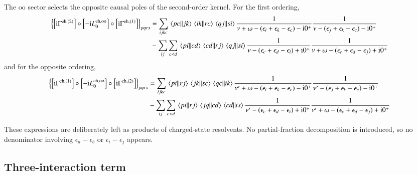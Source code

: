 \documentclass[aip,jcp,reprint,noshowkeys,superscriptaddress]{revtex4-1}
\newcommand{\eps}{\epsilon}
\newcommand{\ii}{\mathrm{i}}
\newcommand{\eh}{\text{eh}}
\begin{document}
\begin{widetext}
The $\text{oo}$ sector selects the opposite causal poles of the second-order kernel.
For the first ordering,
\begin{equation}
    \begin{split}
    \left\{
    \left[\ii\Gamma^{\eh,(2)}\right]
    \circ\left[-\ii L_0^{\eh,\text{oo}}\right]
    \circ\left[\ii\Gamma^{\eh,(1)}\right]
    \right\}_{pqrs}
    & =
    \sum_{ijkc}
    \mel{pc}{}{jk}\mel{ik}{}{rc}\mel{qj}{}{si}
    \frac{1}{\nu+\omega-(\eps_i+\eps_k-\eps_c)-\ii0^+}
    \frac{1}{\nu-(\eps_j+\eps_k-\eps_c)-\ii0^+}
    \\
    &-
    \sum_{ij}\sum_{c<d}
    \mel{pi}{}{cd}\mel{cd}{}{rj}\mel{qj}{}{si}
    \frac{1}{\nu-(\eps_c+\eps_d-\eps_i)+\ii0^+}
    \frac{1}{\nu+\omega-(\eps_c+\eps_d-\eps_j)+\ii0^+}
    \end{split}
    \label{eq:Phi_eh_third_oo_left}
\end{equation}
and for the opposite ordering,
\begin{equation}
    \begin{split}
    \left\{
    \left[\ii\Gamma^{\eh,(1)}\right]
    \circ\left[-\ii L_0^{\eh,\text{oo}}\right]
    \circ\left[\ii\Gamma^{\eh,(2)}\right]
    \right\}_{pqrs}
    & =
    \sum_{ijkc}
    \mel{pi}{}{rj}\mel{jk}{}{sc}\mel{qc}{}{ik}
    \frac{1}{\nu'+\omega-(\eps_i+\eps_k-\eps_c)-\ii0^+}
    \frac{1}{\nu'-(\eps_j+\eps_k-\eps_c)-\ii0^+}
    \\
    &-
    \sum_{ij}\sum_{c<d}
    \mel{pi}{}{rj}\mel{jq}{}{cd}\mel{cd}{}{is}
    \frac{1}{\nu'-(\eps_c+\eps_d-\eps_i)+\ii0^+}
    \frac{1}{\nu'+\omega-(\eps_c+\eps_d-\eps_j)+\ii0^+}
    \end{split}
    \label{eq:Phi_eh_third_oo_right}
\end{equation}
\end{widetext}
These expressions are deliberately left as products of charged-state
resolvents.
No partial-fraction decomposition is introduced, so no denominator involving
$\eps_a-\eps_b$ or $\eps_i-\eps_j$ appears.

\subsection{Three-interaction term}
\end{document}
